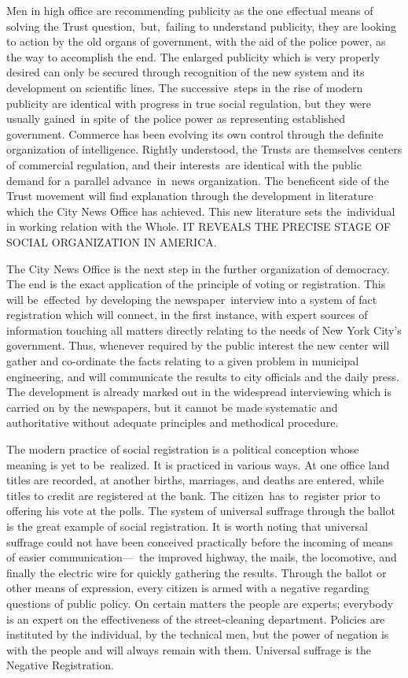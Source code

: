 \documentclass[openany,nobib]{tufte-book}
\begin{document}
Men in high office are recommending publicity as the one effectual means
of solving the Trust question,~but,~failing to understand publicity,
they are looking to action by the old organs of government, with the aid
of the police power, as the way to accomplish the end. The enlarged
publicity which is very properly desired can only be secured through
recognition of the new system and its development on scientific lines.
The successive~steps in the rise of modern publicity are identical with
progress in true social regulation, but they were usually gained~in
spite of~the police power as representing established government.
Commerce has been evolving its own control through the definite
organization of intelligence. Rightly understood, the Trusts are
themselves centers of commercial regulation, and their interests~are
identical with the public demand for a parallel advance~in~news
organization. The beneficent side of the Trust movement will find
explanation through the development in literature which the City News
Office has achieved. This new literature sets the~individual in working
relation with the Whole. IT REVEALS THE PRECISE STAGE OF SOCIAL
ORGANIZATION IN AMERICA.~

The City News Office is the next step in the further organization of
democracy. The end is the exact application of the principle of voting
or registration. This will be~effected~by developing the
newspaper~interview into a system of fact registration which will
connect, in the first instance, with expert sources of information
touching all matters directly relating to the needs of New York City's
government. Thus, whenever required by the public interest the new
center will gather and co-ordinate the facts relating to a given problem
in municipal engineering, and will communicate the results to city
officials and the daily press. The development is already marked out in
the widespread interviewing which is carried on by the newspapers, but
it cannot be made systematic and authoritative without adequate
principles and methodical procedure.~

The modern practice of social registration is a political conception
whose meaning is yet to be~realized. It is practiced in various ways. At
one office land titles are recorded, at another births, marriages, and
deaths are entered, while titles to credit are registered at the bank.
The citizen~has to~register prior to offering his vote at the polls. The
system of universal suffrage through the ballot is the great example of
social registration. It is worth noting that universal suffrage could
not have been conceived practically before the incoming of means of
easier communication---~the improved highway, the mails, the locomotive,
and finally the electric wire for quickly gathering the results. Through
the ballot or other means of expression, every citizen is armed with a
negative regarding questions of public policy. On certain matters the
people are experts; everybody is an expert on the effectiveness of the
street-cleaning department. Policies are instituted by the individual,
by the technical men, but the power of negation is with the people and
will always remain with them. Universal suffrage is the Negative
Registration.~
\end{document}
